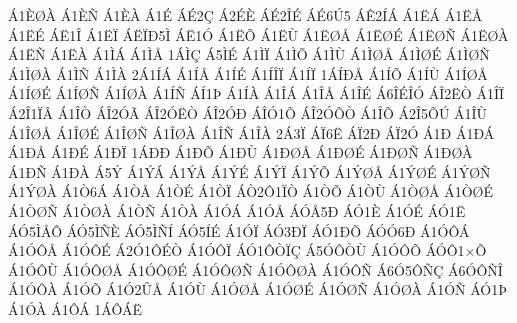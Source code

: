 {^^c11^^c8^^d8^^c0
^^c11^^c8^^d1
^^c11^^c8^^c0
^^c11^^c9
^^c1^^c92^^c7
^^c12^^c9^^c8
^^c1^^c92^^ce^^c9
^^c1^^c96^^da5
^^c1^^ca2^^cd^^c1
^^c11^^cb^^c1
^^c11^^cb^^c5
^^c11^^cb^^c9
^^c1^^cb1^^ce
^^c11^^cb^^cf
^^c1^^cb^^cf^^d05^^cc
^^c1^^cb1^^d3
^^c11^^cb^^d5
^^c11^^cb^^d9
^^c11^^cb^^d8^^c5
^^c11^^cb^^d8^^c9
^^c11^^cb^^d8^^d1
^^c11^^cb^^d8^^c0
^^c11^^cb^^d1
^^c11^^cb^^c0
^^c11^^cc^^c1
^^c11^^cc^^c5
1^^c1^^cc^^c7
^^c15^^cc^^c9
^^c11^^cc^^cf
^^c11^^cc^^d5
^^c11^^cc^^d9
^^c11^^cc^^d8^^c5
^^c11^^cc^^d8^^c9
^^c11^^cc^^d8^^d1
^^c11^^cc^^d8^^c0
^^c11^^cc^^d1
^^c11^^cc^^c0
2^^c11^^cd^^c1
^^c11^^cd^^c5
^^c11^^cd^^c9
^^c11^^cd^^ce^^cf
^^c11^^cd^^cf
1^^c1^^cd^^d0^^c5
^^c11^^cd^^d5
^^c11^^cd^^d9
^^c11^^cd^^d8^^c5
^^c11^^cd^^d8^^c9
^^c11^^cd^^d8^^d1
^^c11^^cd^^d8^^c0
^^c11^^cd^^d1
^^c1^^cd1^^de
^^c11^^cd^^c0
^^c11^^ce^^c1
^^c11^^ce^^c5
^^c11^^ce^^c9
^^c16^^ce^^c9^^ce^^d3
^^c1^^ce2^^cb^^d2
^^c11^^ce^^cf
^^c12^^ce1^^cf^^c2
^^c11^^ce^^d2
^^c1^^ce2^^d3^^c3
^^c1^^ce2^^d3^^cb^^d2
^^c1^^ce2^^d3^^d0
^^c1^^ce^^d31^^d5
^^c1^^ce2^^d3^^d5^^d2
^^c11^^ce^^d5
^^c12^^ce5^^d5^^da
^^c11^^ce^^d9
^^c11^^ce^^d8^^c5
^^c11^^ce^^d8^^c9
^^c11^^ce^^d8^^d1
^^c11^^ce^^d8^^c0
^^c11^^ce^^d1
^^c11^^ce^^c0
2^^c13^^cf
^^c1^^cf6^^cb
^^c1^^cf2^^d0
^^c1^^cf2^^d3
^^c11^^d0
^^c11^^d0^^c1
^^c11^^d0^^c5
^^c11^^d0^^c9
^^c11^^d0^^cf
1^^c1^^d0^^d0
^^c11^^d0^^d5
^^c11^^d0^^d9
^^c11^^d0^^d8^^c5
^^c11^^d0^^d8^^c9
^^c11^^d0^^d8^^d1
^^c11^^d0^^d8^^c0
^^c11^^d0^^d1
^^c11^^d0^^c0
^^c15^^dd
^^c11^^dd^^c1
^^c11^^dd^^c5
^^c11^^dd^^c9
^^c11^^dd^^cf
^^c11^^dd^^d5
^^c11^^dd^^d8^^c5
^^c11^^dd^^d8^^c9
^^c11^^dd^^d8^^d1
^^c11^^dd^^d8^^c0
^^c11^^d26^^c1
^^c11^^d2^^c5
^^c11^^d2^^c9
^^c11^^d2^^cf
^^c1^^d22^^d41^^cf^^d2
^^c11^^d2^^d5
^^c11^^d2^^d9
^^c11^^d2^^d8^^c5
^^c11^^d2^^d8^^c9
^^c11^^d2^^d8^^d1
^^c11^^d2^^d8^^c0
^^c11^^d2^^d1
^^c11^^d2^^c0
^^c11^^d3^^c1
^^c11^^d3^^c5
^^c1^^d3^^c55^^d0
^^c1^^d31^^c8
^^c11^^d3^^c9
^^c1^^d31^^cb
^^c1^^d35^^cc^^c5^^d4
^^c1^^d35^^cc^^d1^^c8
^^c1^^d35^^cc^^d1^^cd
^^c1^^d35^^cd^^c9
^^c11^^d3^^cf
^^c1^^d33^^d0^^cf
^^c1^^d31^^d0^^d5
^^c1^^d3^^d36^^d0
^^c11^^d3^^d4^^c1
^^c11^^d3^^d4^^c5
^^c11^^d3^^d4^^c9
^^c12^^d31^^d4^^c9^^d2
^^c11^^d3^^d4^^cf
^^c1^^d31^^d4^^d2^^cf^^c7
^^c15^^d3^^d4^^d2^^d9
^^c11^^d3^^d4^^d5
^^c1^^d3^^d41^^d7^^d5
^^c11^^d3^^d4^^d9
^^c11^^d3^^d4^^d8^^c5
^^c11^^d3^^d4^^d8^^c9
^^c11^^d3^^d4^^d8^^d1
^^c11^^d3^^d4^^d8^^c0
^^c11^^d3^^d4^^d1
^^c16^^d35^^d4^^d1^^c7
^^c16^^d3^^d4^^d1^^ce
^^c11^^d3^^d4^^c0
^^c11^^d3^^d5
^^c11^^d32^^db^^c5
^^c11^^d3^^d9
^^c11^^d3^^d8^^c5
^^c11^^d3^^d8^^c9
^^c11^^d3^^d8^^d1
^^c11^^d3^^d8^^c0
^^c11^^d3^^d1
^^c1^^d31^^de
^^c11^^d3^^c0
^^c11^^d4^^c1
1^^c1^^d4^^c1^^cb
}
